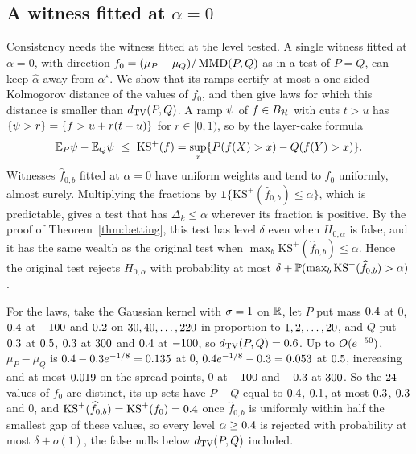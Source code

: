 \subsection{A witness fitted at $\alpha=0$}
\label{sec:alphazero}

Consistency needs the witness fitted at the level tested. A single witness fitted at $\alpha=0$, with direction
$f_0=(\mu_P-\mu_Q)/\operatorname{MMD}(P,Q)$ as in a test of $P=Q$, can keep $\widehat\alpha$ away from $\alpha^\star$. We show that
its ramps certify at most a one-sided Kolmogorov distance of the values of $f_0$, and then give laws for which this
distance is smaller than $d_{\mathrm{TV}}(P,Q)$. A ramp $\psi$ of $f\in B_{\mathcal{H}}$ with cuts $t>u$ has
$\{\psi>r\}=\{f>u+r(t-u)\}$ for $r\in[0,1)$, so by the layer-cake formula
\[
\E_P\rp-\E_Q\rp\ \le\ \mathrm{KS}^+(f)=\sup_x\{P(f(X)>x)-Q(f(Y)>x)\}.
\]
Witnesses $\widehat f_{0,b}$ fitted at $\alpha=0$ have uniform weights and tend to $f_0$ uniformly, almost surely.
Multiplying the fractions by $\mathbf 1\{\mathrm{KS}^+(\widehat f_{0,b})\le\alpha\}$, which is predictable, gives a
test that has $\Delta_k\le\alpha$ wherever its fraction is positive. By the proof of Theorem~\ref{thm:betting}, this
test has level $\delta$ even when $H_{0,\alpha}$ is false, and it has the same wealth as the original test when
$\max_b\mathrm{KS}^+(\widehat f_{0,b})\le\alpha$. Hence the original test rejects $H_{0,\alpha}$ with probability at
most $\delta+\mathbb{P}(\max_b\mathrm{KS}^+(\widehat f_{0,b})>\alpha)$.

For the laws, take the Gaussian kernel with $\sigma=1$ on $\mathbb{R}$, let
$P$ put mass $0.4$ at $0$, $0.4$ at $-100$ and $0.2$ on
$30,40,\dots,220$ in proportion to $1,2,\dots,20$, and $Q$ put $0.3$
at $0.5$, $0.3$ at $300$ and $0.4$ at $-100$, so $d_{\mathrm{TV}}(P,Q)=0.6$. Up to
$O(e^{-50})$, $\mu_P-\mu_Q$ is $0.4-0.3 e^{-1/8}=0.135$ at $0$, $0.4
e^{-1/8}-0.3=0.053$ at $0.5$, increasing and at most $0.019$ on the spread points, $0$ at
$-100$ and $-0.3$ at $300$. So the $24$ values of $f_0$ are distinct, its up-sets have
$P-Q$ equal to $0.4$, $0.1$, at most $0.3$, $0.3$ and $0$, and
$\mathrm{KS}^+(\widehat f_{0,b})=\mathrm{KS}^+(f_0)=0.4$ once $\widehat f_{0,b}$ is uniformly within half the smallest
gap of these values, so every level $\alpha\ge0.4$ is rejected with probability at most $\delta+o(1)$, the false
nulls below $d_{\mathrm{TV}}(P,Q)$ included.
